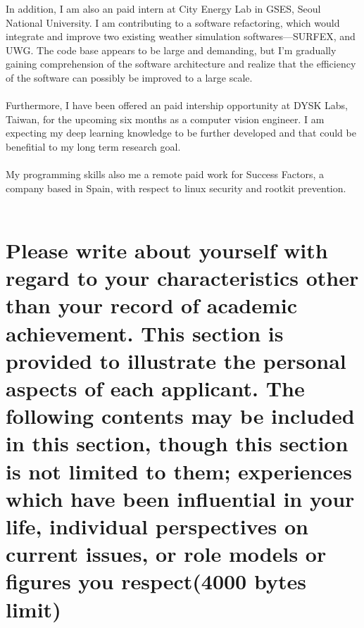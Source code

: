 \documentclass{article}
\begin{document}
In addition, I am also an paid intern at City Energy Lab in GSES, Seoul National University. I am contributing to a software refactoring, which would integrate and improve two existing weather simulation softwares---SURFEX, and UWG. The code base appears to be large and demanding, but I'm gradually gaining comprehension of the software architecture and realize that the efficiency of the software can possibly be improved to a large scale. \\
\\
Furthermore, I have been offered an paid intership opportunity at DYSK Labs, Taiwan, for the upcoming six months as a computer vision engineer. I am expecting my deep learning knowledge to be further developed and that could be benefitial to my long term research goal. \\
\\
My programming skills also me a remote paid work for Success Factors, a company based in Spain, with respect to linux security and rootkit prevention. \\
\\
\section{Please write about yourself with regard to your characteristics other than your record of academic achievement. This section is provided to illustrate the personal aspects of each applicant. The following contents may be included in this section, though this section is not limited to them; experiences which have been influential in your life, individual perspectives on current issues, or role models or figures you respect(4000 bytes limit)}
\end{document}
